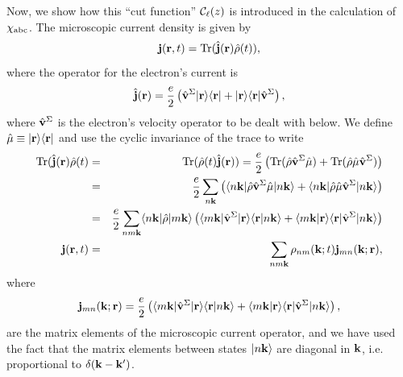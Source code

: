 \documentclass[floatfix,prb,aps,superscriptaddress,11pt,preprint]{revtex4}
\begin{document}
Now, we show how this ``cut function'' ${\mathbf{\cal C}}_\ell(z)$ is introduced in
the calculation of $\chi_{\mathrm{a}\mathrm{b}\mathrm{c}}$.
The microscopic current density is given by
\begin{equation}\label{jmic}
\mathbf{j}(\mathbf{r},t)=\mathrm{Tr}(\hat{\mathbf{j}}(\mathbf{r})\hat\rho(t)),
\end{equation}
where the operator for the electron's current is
\begin{equation}\label{hatjmic}
\hat{\mathbf{j}}(\mathbf{r})=\frac{e}{2}\left(\hat{\mathbf{v}}^\Sigma| \mathbf{r} \rangle\langle \mathbf{r} |
+| \mathbf{r} \rangle\langle \mathbf{r} |\hat{\mathbf{v}}^\Sigma\right), 
\end{equation}
where $\hat{\mathbf{v}}^\Sigma$ is the electron's velocity operator to be dealt
with below. We define
$\hat\mu\equiv| \mathbf{r} \rangle\langle \mathbf{r} |$ and use the cyclic invariance of
the trace to write
\begin{eqnarray}\label{jmic2}
\mathrm{Tr}(\hat{\mathbf{j}}(\mathbf{r})\hat\rho(t)&=&\mathrm{Tr}(\hat\rho(t)\hat{\mathbf{j}}(\mathbf{r}))=
\frac{e}{2}
\left(
\mathrm{Tr}(\hat\rho\hat{\mathbf{v}}^\Sigma\hat\mu)
+
\mathrm{Tr}(\hat\rho\hat\mu\hat{\mathbf{v}}^\Sigma)
\right)
\nonumber\\
&=&
\frac{e}{2}
\sum_{n\mathbf{k}}
\left(
\langle n\mathbf{k} |\hat\rho\hat{\mathbf{v}}^\Sigma\hat\mu| n\mathbf{k} \rangle
+
\langle n\mathbf{k} |\hat\rho\hat\mu\hat{\mathbf{v}}^\Sigma| n\mathbf{k} \rangle
\right)
\nonumber\\
&=&
\frac{e}{2}
\sum_{nm\mathbf{k}}
\langle n\mathbf{k} |\hat\rho| m\mathbf{k} \rangle
\left(
\langle m\mathbf{k} |\hat{\mathbf{v}}^\Sigma| \mathbf{r} \rangle\langle {\mathbf{r}} | {n\mathbf{k}} \rangle
+
\langle {m\mathbf{k}} | {\mathbf{r}} \rangle\langle \mathbf{r} |\hat{\mathbf{v}}^\Sigma| n\mathbf{k} \rangle
\right)
\nonumber\\
\mathbf{j}(\mathbf{r},t)&=&
\sum_{nm\mathbf{k}}
\rho_{nm}(\mathbf{k};t)\mathbf{j}_{mn}(\mathbf{k};\mathbf{r}),
\end{eqnarray}
where
\begin{equation}\label{jmic3}
\mathbf{j}_{mn}(\mathbf{k};\mathbf{r})=
\frac{e}{2}
\left(
\langle m\mathbf{k} |\hat{\mathbf{v}}^\Sigma| \mathbf{r} \rangle\langle {\mathbf{r}} | {n\mathbf{k}} \rangle
+
\langle {m\mathbf{k}} | {\mathbf{r}} \rangle\langle \mathbf{r} |\hat{\mathbf{v}}^\Sigma| n\mathbf{k} \rangle
\right),
\end{equation}
are the matrix elements of the microscopic current operator,
and we have used the fact that the matrix elements between states $| n\mathbf{k} \rangle$
are diagonal in $\mathbf{k}$, i.e. proportional to $\delta(\mathbf{k}-\mathbf{k}')$.
\end{document}
